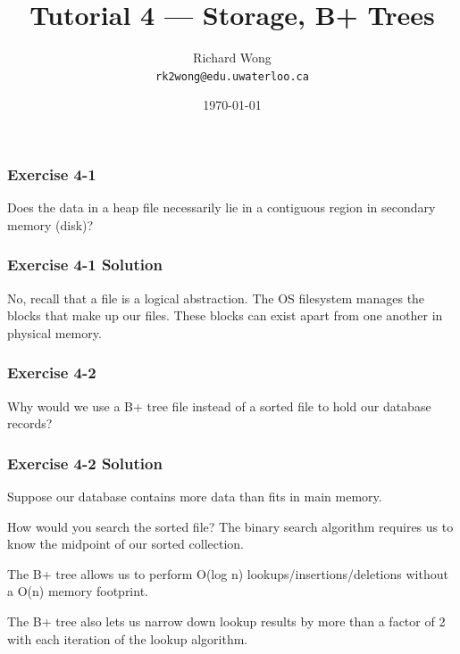 

\title{Tutorial 4 --- Storage, B+ Trees}

\author{Richard Wong \\ \small \texttt{rk2wong@edu.uwaterloo.ca}}
\date{\today}




\begin{frame}
  \titlepage

\end{frame}


\begin{frame}
\frametitle{Exercise 4-1}

Does the data in a heap file necessarily lie in a contiguous region in secondary memory (disk)?

\end{frame}


\begin{frame}
\frametitle{Exercise 4-1 Solution}

No, recall that a file is a logical abstraction.
The OS filesystem manages the blocks that make up our files.
These blocks can exist apart from one another in physical memory.

\end{frame}


\begin{frame}
\frametitle{Exercise 4-2}

Why would we use a B+ tree file instead of a sorted file to hold our database records?

\end{frame}


\begin{frame}
\frametitle{Exercise 4-2 Solution}

Suppose our database contains more data than fits in main memory.

How would you search the sorted file? The binary search algorithm requires us to know the midpoint of our sorted collection.

The B+ tree allows us to perform O(log n) lookups/insertions/deletions without a O(n) memory footprint.

The B+ tree also lets us narrow down lookup results by more than a factor of 2 with each iteration of the lookup algorithm.

\end{frame}


